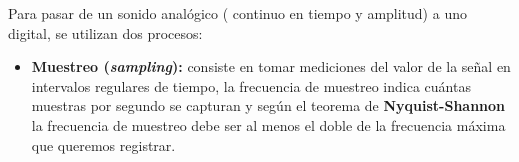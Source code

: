 Para pasar de un sonido analógico ( continuo en tiempo y amplitud) a uno digital, se utilizan dos procesos:
\begin{itemize}
    \item \textbf{Muestreo (\textit{sampling}):} consiste en tomar mediciones del valor de la señal en intervalos regulares de tiempo, la frecuencia de muestreo indica cuántas muestras por segundo se capturan y según el teorema de \textbf{Nyquist-Shannon} la frecuencia de muestreo debe ser al menos el doble de la frecuencia máxima que queremos registrar. \cite{shannon1949communication}
\end{itemize}